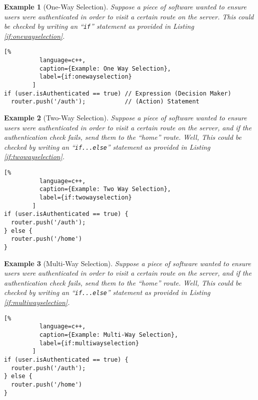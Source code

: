 \documentclass[12pt]{report}
\theoremstyle{definition}
\theoremstyle{plain}
\theoremstyle{plain}
\newtheorem*{examp*}{Example}
\begin{document}
        \begin{examp*}[One-Way Selection]
          Suppose a piece of software wanted to ensure users were authenticated
            in order to visit a certain route on the server. This could be
            checked by writing an ``\texttt{if}'' statement as provided in
            Listing \ref{if:onewayselection}.
        \end{examp*}

        \begin{lstlisting}[%
          language=c++,
          caption={Example: One Way Selection},
          label={if:onewayselection}
        ]
if (user.isAuthenticated == true) // Expression (Decision Maker)
  router.push('/auth');           // (Action) Statement
        \end{lstlisting}

        \begin{examp*}[Two-Way Selection]
          Suppose a piece of software wanted to ensure users were authenticated
            in order to visit a certain route on the server, and \emph{if the
            authentication check fails}, send them to the ``home'' route. Well,
            This could be checked by writing an ``\texttt{if...else}'' statement
            as provided in Listing \ref{if:twowayselection}.
        \end{examp*}

        \begin{lstlisting}[%
          language=c++,
          caption={Example: Two Way Selection},
          label={if:twowayselection}
        ]
if (user.isAuthenticated == true) {
  router.push('/auth');
} else {
  router.push('/home')
}
        \end{lstlisting}

        \newpage
        \begin{examp*}[Multi-Way Selection]
          Suppose a piece of software wanted to ensure users were authenticated
            in order to visit a certain route on the server, and \emph{if the
            authentication check fails}, send them to the ``home'' route. Well,
            This could be checked by writing an ``\texttt{if...else}'' statement
            as provided in Listing \ref{if:multiwayselection}.
        \end{examp*}

        \begin{lstlisting}[%
          language=c++,
          caption={Example: Multi-Way Selection},
          label={if:multiwayselection}
        ]
if (user.isAuthenticated == true) {
  router.push('/auth');
} else {
  router.push('/home')
}
        \end{lstlisting}
\end{document}
